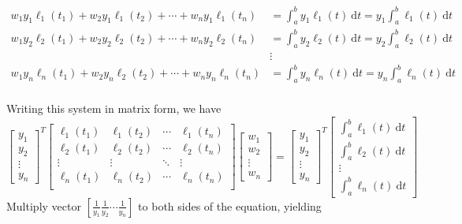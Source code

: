 \begin{align*}
w_1y_1\ell_1(t_1) + w_2y_1\ell_1(t_2) + \cdots + w_ny_1\ell_1(t_n) &= \int_{a}^{b}y_1\ell_1(t)\:\mathrm{d}t = y_1\int_{a}^{b}\ell_1(t)\:\mathrm{d}t \\
w_1y_2\ell_2(t_1) + w_2y_2\ell_2(t_2) + \cdots + w_ny_2\ell_2(t_n) &= \int_{a}^{b}y_2\ell_2(t)\:\mathrm{d}t = y_2\int_{a}^{b}\ell_2(t)\:\mathrm{d}t \\
&\vdots\\
w_1y_n\ell_n(t_1) + w_2y_n\ell_2(t_2) + \cdots + w_ny_n\ell_n(t_n) &= \int_{a}^{b}y_n\ell_n(t)\:\mathrm{d}t = y_n\int_{a}^{b}\ell_n(t)\:\mathrm{d}t \\
\end{align*}

Writing this system in matrix form, we have
\begin{equation*}
\begin{bmatrix}
y_1\\
y_2\\
\vdots\\
y_n
\end{bmatrix}^T
\begin{bmatrix}
\ell_1(t_1) & \ell_1(t_2) & \cdots & \ell_1(t_n) \\
\ell_2(t_1) & \ell_2(t_2) & \cdots & \ell_2(t_n) \\
\vdots & \vdots & \ddots & \vdots\\
\ell_n(t_1) & \ell_n(t_2) & \cdots & \ell_n(t_n) \\
\end{bmatrix}
\begin{bmatrix}
w_1\\
w_2\\
\vdots\\
w_n
\end{bmatrix}
=
\begin{bmatrix}
y_1\\
y_2\\
\vdots\\
y_n
\end{bmatrix}^T
\begin{bmatrix}
\int_{a}^{b}\ell_1(t)\:\mathrm{d}t\\
\int_{a}^{b}\ell_2(t)\:\mathrm{d}t\\
\vdots\\
\int_{a}^{b}\ell_n(t)\:\mathrm{d}t
\end{bmatrix}
\end{equation*}
Multiply vector $\left[\frac{1}{y_1} \frac{1}{y_2} \cdots \frac{1}{y_n}\right]$ to both sides of the equation, yielding
